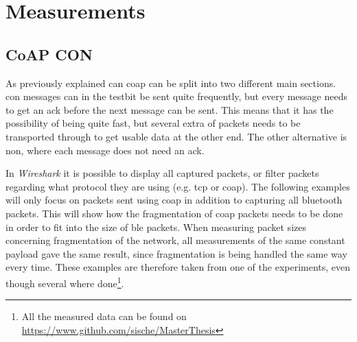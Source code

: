 \newpage

\section{Measurements}

\subsection{CoAP CON}

\noindent As previously explained can \gls{coap} can be split into two different main sections. \gls{con} messages can in the testbit be sent quite frequently, but every message needs to get an \gls{ack} before the next message can be sent. This means that it has the possibility of being quite fast, but several extra of packets needs to be transported through to get usable data at the other end. The other alternative is \gls{non}, where each message does not need an \gls{ack}. 






\noindent In \textit{Wireshark} it is possible to display all captured packets, or filter packets regarding what protocol they are using (e.g. \gls{tcp} or \gls{coap}). The following examples will only focus on packets sent using \gls{coap} in addition to capturing all bluetooth packets. This will show how the fragmentation of \gls{coap} packets needs to be done in order to fit into the size of \gls{ble} packets. When measuring packet sizes concerning fragmentation of the network, all measurements of the same constant \gls{payload} gave the same result, since fragmentation is being handled the same way every time. These examples are therefore taken from one of the experiments, even though several where done\footnote{All the measured data can be found on \url{https://www.github.com/sische/MasterThesis}}. 

